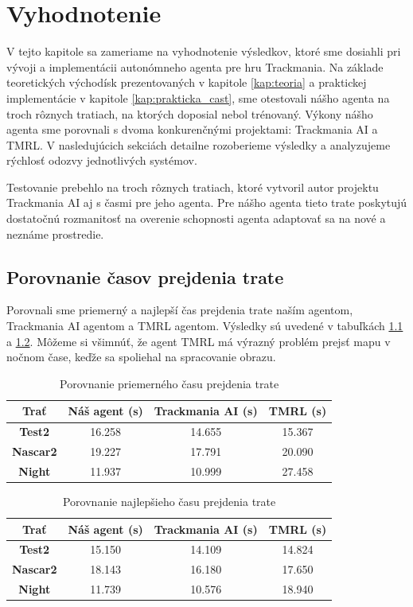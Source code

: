\chapter{Vyhodnotenie}
\label{kap:vyhodnotenie}

V tejto kapitole sa zameriame na vyhodnotenie výsledkov, ktoré sme dosiahli pri vývoji a implementácii autonómneho agenta pre hru Trackmania. Na základe teoretických východísk prezentovaných v kapitole \ref{kap:teoria} a praktickej implementácie v kapitole \ref{kap:prakticka_cast}, sme otestovali nášho agenta na troch rôznych tratiach, na ktorých doposial nebol trénovaný. Výkony nášho agenta sme porovnali s dvoma konkurenčnými projektami: Trackmania AI a TMRL. V nasledujúcich sekciách detailne rozoberieme výsledky a analyzujeme rýchlosť odozvy jednotlivých systémov.

Testovanie prebehlo na troch rôznych tratiach, ktoré vytvoril autor projektu Trackmania AI aj s časmi pre jeho agenta. Pre nášho agenta tieto trate poskytujú dostatočnú rozmanitosť na overenie schopnosti agenta adaptovať sa na nové a neznáme prostredie.

\section{Porovnanie časov prejdenia trate}
\label{sec:cas_prejdenia}

Porovnali sme priemerný a najlepší čas prejdenia trate naším agentom, Trackmania AI agentom a TMRL agentom. Výsledky sú uvedené v tabuľkách \ref{tab:cas} a \ref{tab:najlepsi_cas}. Môžeme si všimnúť, že agent TMRL má výrazný problém prejsť mapu v nočnom čase, keďže sa spoliehal na spracovanie obrazu.

\begin{table}[h]
\centering
\begin{tabular}{|c|c|c|c|}
\hline
\textbf{Trať} & \textbf{Náš agent (s)} & \textbf{Trackmania AI (s)} & \textbf{TMRL (s)} \\ \hline
\textbf{Test2} & 16.258 & 14.655 & 15.367 \\ \hline
\textbf{Nascar2} & 19.227 & 17.791 & 20.090 \\ \hline
\textbf{Night} & 11.937 & 10.999 & 27.458 \\ \hline
\end{tabular}
\caption{Porovnanie priemerného času prejdenia trate}
\label{tab:cas}
\end{table}

\begin{table}[h]
\centering
\begin{tabular}{|c|c|c|c|}
\hline
\textbf{Trať} & \textbf{Náš agent (s)} & \textbf{Trackmania AI (s)} & \textbf{TMRL (s)} \\ \hline
\textbf{Test2} & 15.150 & 14.109 & 14.824 \\ \hline
\textbf{Nascar2} & 18.143 & 16.180 & 17.650 \\ \hline
\textbf{Night} & 11.739 & 10.576 & 18.940 \\ \hline
\end{tabular}
\caption{Porovnanie najlepšieho času prejdenia trate}
\label{tab:najlepsi_cas}
\end{table}

